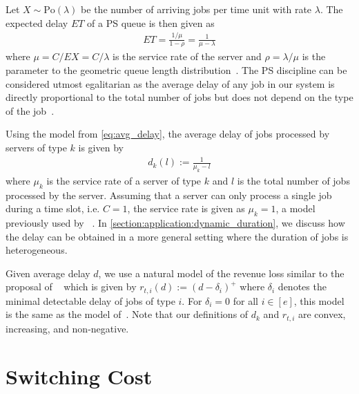 Let $X \sim \text{Po}(\lambda)$ be the number of arriving jobs per time unit with rate $\lambda$. The expected delay $E T$ of a PS queue is then given as \begin{align}\label{eq:avg_delay}
    E T = \frac{1/\mu}{1-\rho} = \frac{1}{\mu - \lambda}
\end{align} where $\mu = C / E X = C / \lambda$ is the service rate of the server and $\rho = \lambda / \mu$ is the parameter to the geometric queue length distribution~\cite{Virtamo2007}. The PS discipline can be considered utmost egalitarian as the average delay of any job in our system is directly proportional to the total number of jobs but does not depend on the type of the job~\cite{Virtamo2007}.

Using the model from \cref{eq:avg_delay}, the average delay of jobs processed by servers of type $k$ is given by \begin{align}\label{eq:delay}
    d_{k}(l) := \frac{1}{\mu_k - l}
\end{align} where $\mu_k$ is the service rate of a server of type $k$ and $l$ is the total number of jobs processed by the server. Assuming that a server can only process a single job during a time slot, i.e. $C = 1$, the service rate is given as $\mu_k = 1$, a model previously used by \citeauthor{Lin2011}~\cite{Lin2011, Lin2012}. In \cref{section:application:dynamic_duration}, we discuss how the delay can be obtained in a more general setting where the duration of jobs is heterogeneous.

Given average delay $d$, we use a natural model of the revenue loss similar to the proposal of \citeauthor{Lin2011}~\cite{Lin2011} which is given by $r_{t,i}(d) := (d - \delta_i)^+$ where $\delta_i$ denotes the minimal detectable delay of jobs of type $i$. For $\delta_i = 0$ for all $i \in [e]$, this model is the same as the model of~\cite{Lin2012}. Note that our definitions of $d_k$ and $r_{t,i}$ are convex, increasing, and non-negative.

\section{Switching Cost}\label{section:application:switching_cost}

